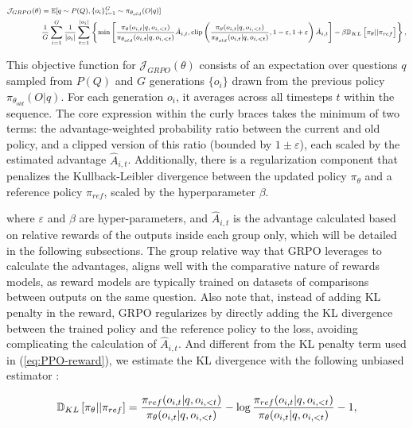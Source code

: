 \begin{itemize}[topsep=0pt]
\begin{itemize}[topsep=0pt]
\begin{equation}
\footnotesize
\begin{split}
    \mathcal{J}_{GRPO}(\theta) &= \mathbb{E}{[q \sim P(Q), \{o_i\}_{i=1}^G \sim \pi_{\theta_{old}}(O|q)]}  \\
    & \frac{1}{G}\sum_{i=1}^G\frac{1}{|o_i|} \sum_{t=1}^{|o_i|} \left\{ \min \left[ \frac{\pi_\theta(o_{i,t} | q, o_{i,<t})}{\pi_{\theta_{old}}(o_{i,t} | q, o_{i,<t})} \hat{A}_{i,t}, \text{clip} \left( \frac{\pi_\theta(o_{i,t} | q, o_{i,<t})}{\pi_{\theta_{old}}(o_{i,t} | q, o_{i,<t})}, 1 - \varepsilon, 1 + \varepsilon \right)  \hat{A}_{i,t} \right] - \beta \mathbb{D}_{KL}\left[\pi_{\theta} || \pi_{ref}\right]\right\} ,
\end{split}
\label{eq:GRPO-obj}
\end{equation}

This objective function for $\mathcal{J}_{GRPO}(\theta)$ consists of an expectation over questions $q$ sampled from $P(Q)$ and $G$ generations $\{o_i\}$ drawn from the previous policy $\pi_{\theta_{old}}(O|q)$. For each generation $o_i$, it averages across all timesteps $t$ within the sequence. The core expression within the curly braces takes the minimum of two terms: the advantage-weighted probability ratio between the current and old policy, and a clipped version of this ratio (bounded by $1 \pm \varepsilon$), each scaled by the estimated advantage $\hat{A}_{i,t}$. Additionally, there is a regularization component that penalizes the Kullback-Leibler divergence between the updated policy $\pi_\theta$ and a reference policy $\pi_{ref}$, scaled by the hyperparameter $\beta$.

where $\varepsilon$ and $\beta$ are hyper-parameters, and $\hat{A}_{i,t}$  is the advantage calculated based on relative rewards of the outputs inside each group only, which will be detailed in the following subsections. The group relative way that GRPO leverages to calculate the advantages, aligns well with the comparative nature of rewards models,  as reward models are typically trained on datasets of comparisons between outputs on the same question. Also note that, instead of adding KL penalty in the reward, GRPO regularizes by directly adding the KL divergence between the trained policy and the reference policy to the loss, avoiding complicating the calculation of  $\hat{A}_{i,t}$. And different from the KL penalty term used in (\ref{eq:PPO-reward}), we estimate the KL divergence with the following unbiased estimator \citep{kl_approx}:

\begin{equation}
\small
    \mathbb{D}_{KL}\left[\pi_{\theta} || \pi_{ref}\right] = \frac{\pi_{ref}(o_{i,t}|q,o_{i,<t})}{\pi_{\theta}(o_{i,t}|q,o_{i,<t})}- \log\frac{\pi_{ref}(o_{i,t}|q,o_{i,<t})}{\pi_{\theta}(o_{i,t}|q,o_{i,<t})} - 1,
\end{equation}


\end{itemize}
\end{itemize}
